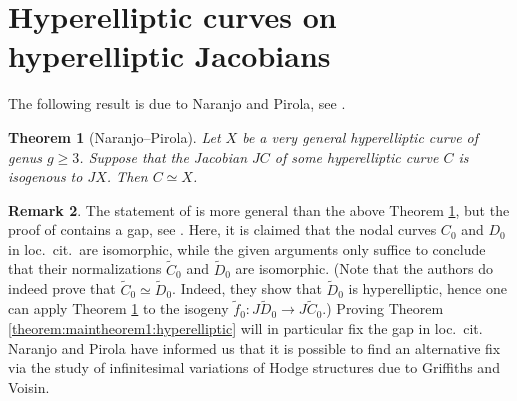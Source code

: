 \documentclass[a4paper,11pt,reqno]{amsart}
\numberwithin{equation}{section}
\newtheorem{theorem}{Theorem}[section]
\theoremstyle{plain}
\theoremstyle{definition}
\newtheorem{remark}[theorem]{Remark}
\renewcommand{\cong}{\simeq}
\begin{document}
\section{Hyperelliptic curves on hyperelliptic Jacobians} \label{section:genusgcurveshyperellipticjacobians}
 
The following result is due to Naranjo and Pirola, see \cite[Theorem 1.1]{naranjopirola2018}. 

\begin{theorem}[Naranjo--Pirola] \label{theorem:C-hyperell-g=3}
Let $X$ be a very general hyperelliptic curve of genus $g \geq 3$. Suppose that the Jacobian $JC$ of some hyperelliptic curve $C$ is isogenous to $JX$. Then $C \cong X$.  
\end{theorem}

 \begin{remark} \label{rem:naranjo-pirola:2}  
 The statement of \cite[Theorem 1.1]{naranjopirola2018} is more general than the above Theorem \ref{theorem:C-hyperell-g=3}, but the proof of \cite[Theorem 1.1]{naranjopirola2018} contains a gap, see \cite[line -5 in the proof of Theorem 1.1]{naranjopirola2018}. 
Here, it is claimed that the nodal curves $C_0$ and $D_0$ in loc.\ cit.\ are isomorphic, while the given arguments only suffice to conclude that their normalizations $\tilde C_0$ and $\tilde D_0$ are isomorphic. 
(Note that the authors do indeed prove that $\tilde C_0 \cong \tilde D_0$. 
Indeed, they show that $\tilde D_0$ is hyperelliptic, hence one can apply Theorem \ref{theorem:C-hyperell-g=3} to the isogeny  $\tilde f_0 \colon J\tilde D_0 \to J \tilde C_0$.)
Proving Theorem \ref{theorem:maintheorem1:hyperelliptic} will in particular fix the gap in loc.\ cit.  
Naranjo and Pirola have informed us that it is possible to find an alternative fix via the study of infinitesimal variations of Hodge structures due to Griffiths and Voisin. 
\end{remark}
\end{document}
